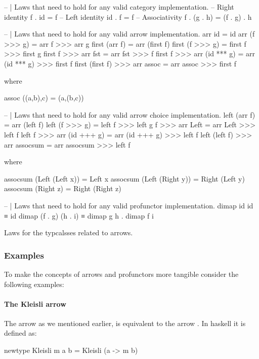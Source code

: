 \begin{code}
\begin{haskellcode}
-- | Laws that need to hold for any valid category implementation.
-- Right identity
f . id = f
-- Left identity
id . f = f
-- Associativity
f . (g . h) = (f . g) . h


-- | Laws that need to hold for any valid arrow implementation.
arr id = id
arr (f >>> g) = arr f >>> arr g
first (arr f) = arr (first f)
first (f >>> g) = first f >>> first g
first f >>> arr fst = arr fst >>> f
first f >>> arr (id *** g) = arr (id *** g) >>> first f
first (first f) >>> arr assoc = arr assoc >>> first f

where

assoc ((a,b),c) = (a,(b,c))

-- | Laws that need to hold for any valid arrow choice implementation.
left (arr f) = arr (left f)
left (f >>> g) = left f >>> left g
f >>> arr Left = arr Left >>> left f
left f >>> arr (id +++ g) = arr (id +++ g) >>> left f
left (left f) >>> arr assocsum = arr assocsum >>> left f

where

assocsum (Left (Left x)) = Left x
assocsum (Left (Right y)) = Right (Left y)
assocsum (Right z) = Right (Right z)

-- | Laws that need to hold for any valid profunctor implementation.
dimap id id ≡ id
dimap (f . g) (h . i) ≡ dimap g h . dimap f i
\end{haskellcode}
  \caption{\label{lst:arrow_laws}Laws for the typcalsses related to
    arrows.}
\end{code}

\subsubsection{Examples}

To make the concepts of arrows and profunctors more tangible consider
the following examples:

\paragraph{The Kleisli arrow}

The  arrow \cite{dawsonCompoundMonadsKleisli2007} as we
mentioned earlier, is equivalent to the arrow . In haskell it is defined as:

\begin{haskellcode}
newtype Kleisli m a b = Kleisli (a -> m b)
\end{haskellcode}

